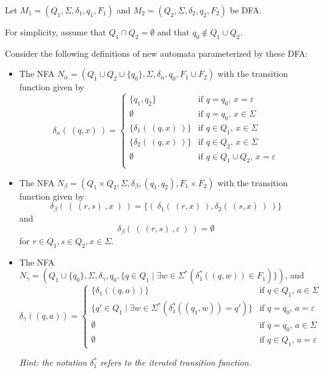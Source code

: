 \begin{enumerate}[wide, labelwidth=!, labelindent=0pt]
Let $M_1 = (Q_1, \Sigma, \delta_1, q_1, F_1)$ and 
$M_2 = (Q_2, \Sigma, \delta_2, q_2, F_2)$ be DFA.

For simplicity, assume that $Q_1 \cap Q_2 = \emptyset$ and that 
$q_0 \notin Q_1 \cup Q_2$.

Consider the following definitions of new automata parameterized by 
these DFA:
\begin{itemize}
\item The NFA $N_\alpha = ( Q_1 \cup Q_2 \cup \{q_0\}, \Sigma, \delta_\alpha, q_0, F_1 \cup F_2)$ with the transition function given by 
\[
\delta_\alpha ( ~(q,x)~) = \begin{cases}
\{q_1, q_2\} &\text{if $q = q_0$, $x = \varepsilon$} \\
\emptyset &\text{if $q=q_0$, $x\in \Sigma$}\\
\{\delta_{1}(~(q,x)~)\} &\text{if $q\in Q_1$, $x\in \Sigma$}\\
\{\delta_{2}(~(q,x)~)\} &\text{if $q\in Q_2$, $x\in \Sigma$}\\
\emptyset &\text{if $q \in Q_1 \cup Q_2$, $x = \varepsilon$} \\
\end{cases}
\]
\item The NFA $N_\beta = ( Q_1 \times Q_2, \Sigma, \delta_\beta, (q_1,q_2), F_1 \times F_2)$  with the transition function given by 
\[
\delta_\beta(~(~(r,s)~, x~)~) = \{ (~\delta_{1}(~(r,x)~), \delta_{2}( ~(s,x)~)~)\}
\]
 and 
\[
\delta_\beta(~(~(r,s)~, \varepsilon~)~) = \emptyset
\]
for $r \in Q_1, s \in Q_2, x \in \Sigma$.
\item The NFA $N_{\gamma}=(Q_1\cup\{q_{0}\},\Sigma,\delta_{\gamma},q_{0},\{q \in Q_1 \mid \exists w \in \Sigma^* (\delta_1^* ((q,w)) \in F_1)\})$, and
        \[
            \delta_{\gamma} ((q,a)) = \begin{cases}
                \{\delta_1((q,a))\} &\text{if $q \in Q_1$, $a \in \Sigma$} \\
                \{q' \in Q_1 \mid \exists w \in \Sigma^* (\delta_1^*((q_1,w)) = q') \}&\text{if $q =q_{0}$, $a = \varepsilon$}\\
                \emptyset &\text{if $q = q_{0}$, $a \in \Sigma$} \\
                \emptyset &\text{if $q \in Q_1$, $a = \varepsilon$}
            \end{cases}
        \]

{\it Hint: the notation $\delta_1^*$ refers to the iterated transition function.}
\end{itemize}




\end{enumerate}

